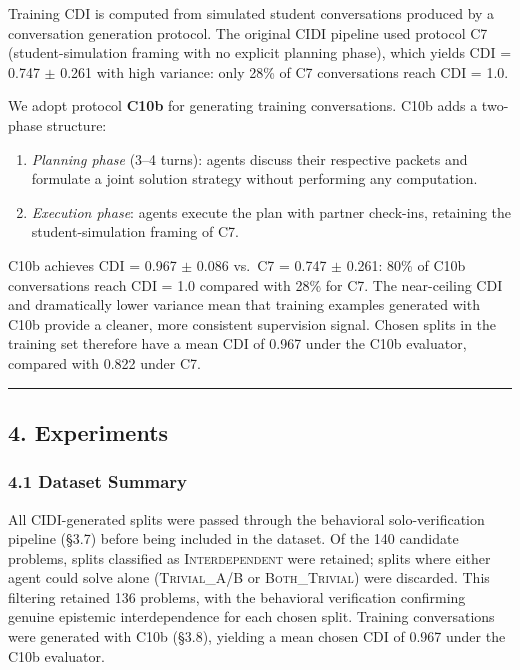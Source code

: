 \documentclass[
  11pt,
]{article}
\providecommand{\tightlist}{%
  \setlength{\itemsep}{0pt}\setlength{\parskip}{0pt}}
\begin{document}
Training CDI is computed from simulated student conversations produced
by a conversation generation protocol. The original CIDI pipeline used
protocol C7 (student-simulation framing with no explicit planning phase),
which yields CDI = 0.747 $\pm$ 0.261 with high variance: only 28\% of
C7 conversations reach CDI = 1.0.

We adopt protocol \textbf{C10b} for generating training conversations.
C10b adds a two-phase structure:
\begin{enumerate}
\def\labelenumi{\arabic{enumi}.}
\tightlist
\item \emph{Planning phase} (3--4 turns): agents discuss their
  respective packets and formulate a joint solution strategy without
  performing any computation.
\item \emph{Execution phase}: agents execute the plan with partner
  check-ins, retaining the student-simulation framing of C7.
\end{enumerate}

C10b achieves CDI = 0.967 $\pm$ 0.086 vs.\ C7 = 0.747 $\pm$ 0.261: 80\%
of C10b conversations reach CDI = 1.0 compared with 28\% for C7. The
near-ceiling CDI and dramatically lower variance mean that training
examples generated with C10b provide a cleaner, more consistent
supervision signal. Chosen splits in the training set therefore have a
mean CDI of 0.967 under the C10b evaluator, compared with 0.822 under C7.

\begin{center}\rule{0.5\linewidth}{0.5pt}\end{center}

\subsection{4. Experiments}\label{experiments}

\subsubsection{4.1 Dataset Summary}\label{dataset-summary}

All CIDI-generated splits were passed through the behavioral
solo-verification pipeline (§3.7) before being included in the dataset.
Of the 140 candidate problems, splits classified as
\textsc{Interdependent} were retained; splits where either agent could
solve alone (\textsc{Trivial\_A/B} or \textsc{Both\_Trivial}) were
discarded. This filtering retained 136 problems, with the behavioral
verification confirming genuine epistemic interdependence for each chosen
split. Training conversations were generated with C10b (§3.8), yielding
a mean chosen CDI of 0.967 under the C10b evaluator.
\end{document}
